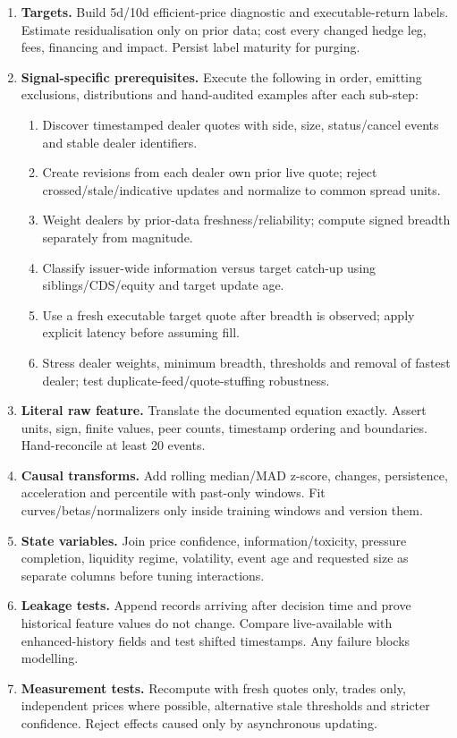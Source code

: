 \documentclass[10pt]{article}
\begin{document}
\begin{enumerate}[leftmargin=2em,label=\textbf{A\arabic*.}]
\item \textbf{Targets.} Build 5d/10d efficient-price diagnostic and executable-return labels. Estimate residualisation only on prior data; cost every changed hedge leg, fees, financing and impact. Persist label maturity for purging.
\item \textbf{Signal-specific prerequisites.} Execute the following in order, emitting exclusions, distributions and hand-audited examples after each sub-step:
\begin{enumerate}[label=\alph*)]
\item Discover timestamped dealer quotes with side, size, status/cancel events and stable dealer identifiers.
\item Create revisions from each dealer own prior live quote; reject crossed/stale/indicative updates and normalize to common spread units.
\item Weight dealers by prior-data freshness/reliability; compute signed breadth separately from magnitude.
\item Classify issuer-wide information versus target catch-up using siblings/CDS/equity and target update age.
\item Use a fresh executable target quote after breadth is observed; apply explicit latency before assuming fill.
\item Stress dealer weights, minimum breadth, thresholds and removal of fastest dealer; test duplicate-feed/quote-stuffing robustness.
\end{enumerate}
\item \textbf{Literal raw feature.} Translate the documented equation exactly. Assert units, sign, finite values, peer counts, timestamp ordering and boundaries. Hand-reconcile at least 20 events.
\item \textbf{Causal transforms.} Add rolling median/MAD z-score, changes, persistence, acceleration and percentile with past-only windows. Fit curves/betas/normalizers only inside training windows and version them.
\item \textbf{State variables.} Join price confidence, information/toxicity, pressure completion, liquidity regime, volatility, event age and requested size as separate columns before tuning interactions.
\item \textbf{Leakage tests.} Append records arriving after decision time and prove historical feature values do not change. Compare live-available with enhanced-history fields and test shifted timestamps. Any failure blocks modelling.
\item \textbf{Measurement tests.} Recompute with fresh quotes only, trades only, independent prices where possible, alternative stale thresholds and stricter confidence. Reject effects caused only by asynchronous updating.

\end{enumerate}
\end{document}
